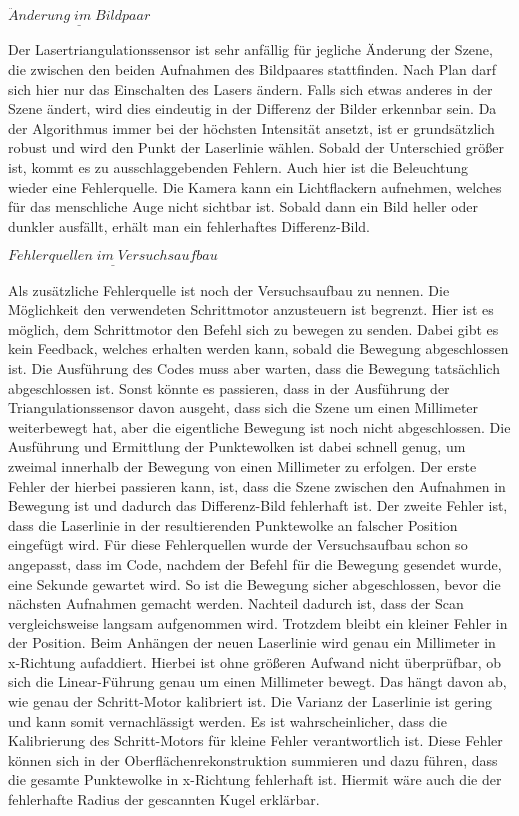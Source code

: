 		$\underline{\ddot{A}nderung \; im \; Bildpaar}$
		
		Der Lasertriangulationssensor ist sehr anfällig für jegliche Änderung der Szene, die zwischen den beiden Aufnahmen des Bildpaares stattfinden. Nach Plan darf sich hier nur das Einschalten des Lasers ändern. Falls sich etwas anderes in der Szene ändert, wird dies eindeutig in der Differenz der Bilder erkennbar sein. Da der Algorithmus immer bei der höchsten Intensität ansetzt, ist er grundsätzlich robust und wird den Punkt der Laserlinie wählen. Sobald der Unterschied größer ist, kommt es zu ausschlaggebenden Fehlern. Auch hier ist die Beleuchtung wieder eine Fehlerquelle. Die Kamera kann ein Lichtflackern aufnehmen, welches für das menschliche Auge nicht sichtbar ist. Sobald dann ein Bild heller oder dunkler ausfällt, erhält man ein fehlerhaftes Differenz-Bild.
		
		$\underline{Fehlerquellen \; im \; Versuchsaufbau}$
		
		Als zusätzliche Fehlerquelle ist noch der Versuchsaufbau zu nennen. Die Möglichkeit den verwendeten Schrittmotor anzusteuern ist begrenzt. Hier ist es möglich, dem Schrittmotor den Befehl sich zu bewegen zu senden. Dabei gibt es kein Feedback, welches erhalten werden kann, sobald die Bewegung abgeschlossen ist. Die Ausführung des Codes muss aber warten, dass die Bewegung tatsächlich abgeschlossen ist. Sonst könnte es passieren, dass in der Ausführung der Triangulationssensor davon ausgeht, dass sich die Szene um einen Millimeter weiterbewegt hat, aber die eigentliche Bewegung ist noch nicht abgeschlossen. Die Ausführung und Ermittlung der Punktewolken ist dabei schnell genug, um zweimal innerhalb der Bewegung von einen Millimeter zu erfolgen. Der erste Fehler der hierbei passieren kann, ist, dass die Szene zwischen den Aufnahmen in Bewegung ist und dadurch das Differenz-Bild fehlerhaft ist. Der zweite Fehler ist, dass die Laserlinie in der resultierenden Punktewolke an falscher Position eingefügt wird. Für diese Fehlerquellen wurde der Versuchsaufbau schon so angepasst, dass im Code, nachdem der Befehl für die Bewegung gesendet wurde, eine Sekunde gewartet wird. So ist die Bewegung sicher abgeschlossen, bevor die nächsten Aufnahmen gemacht werden. Nachteil dadurch ist, dass der Scan vergleichsweise langsam aufgenommen wird. Trotzdem bleibt ein kleiner Fehler in der Position. Beim Anhängen der neuen Laserlinie wird genau ein Millimeter in x-Richtung aufaddiert. Hierbei ist ohne größeren Aufwand nicht überprüfbar, ob sich die Linear-Führung genau um einen Millimeter bewegt. Das hängt davon ab, wie genau der Schritt-Motor kalibriert ist. Die Varianz der Laserlinie ist gering und kann somit vernachlässigt werden. Es ist wahrscheinlicher, dass die Kalibrierung des Schritt-Motors für kleine Fehler verantwortlich ist. Diese Fehler können sich in der Oberflächenrekonstruktion summieren und dazu führen, dass die gesamte Punktewolke in x-Richtung fehlerhaft ist. Hiermit wäre auch die der fehlerhafte Radius der gescannten Kugel erklärbar.
		
